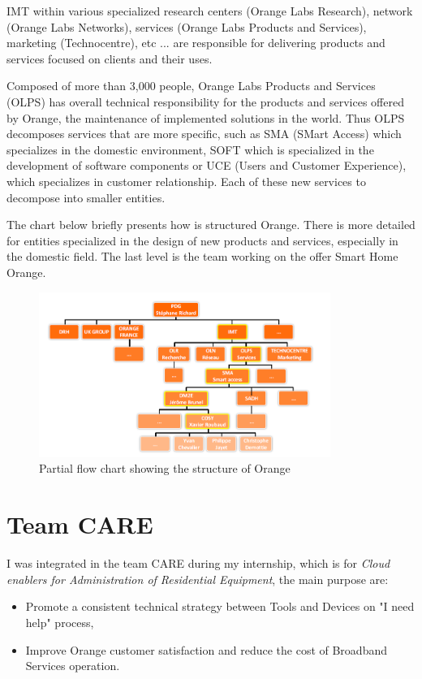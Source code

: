 IMT within various specialized research centers (Orange Labs Research), network (Orange Labs Networks), services (Orange Labs Products and Services), marketing (Technocentre), etc ... are responsible for delivering products and services focused on clients and their uses.

Composed of more than 3,000 people, Orange Labs Products and Services (OLPS) has overall technical responsibility for the products and services offered by Orange, the maintenance of implemented solutions in the world. Thus OLPS decomposes services that are more specific, such as SMA (SMart Access) which specializes in the domestic environment, SOFT which is specialized in the development of software components or UCE (Users and Customer Experience), which specializes in customer relationship. Each of these new services to decompose into smaller entities.

The chart below briefly presents how is structured Orange. There is more detailed for entities specialized in the design of new products and services, especially in the domestic field. The last level is the team working on the offer Smart Home Orange.

\begin{figure}[htbp]
	\centering
		\includegraphics[width=9.5cm]{Figures/structureorange.png}
	\caption[Partial flow chart showing the structure of Orange]{Partial flow chart showing the structure of Orange}
	\label{fig:structure}
\end{figure}
\section{Team CARE}

I was integrated in the team CARE during my internship, which is for \textit{Cloud enablers for Administration of Residential Equipment}, the main purpose are:
\begin{itemize}
	\item Promote a consistent technical strategy between Tools and Devices on "I need help" process,
	\item Improve Orange customer satisfaction and reduce the cost of Broadband Services operation.
\end{itemize}

